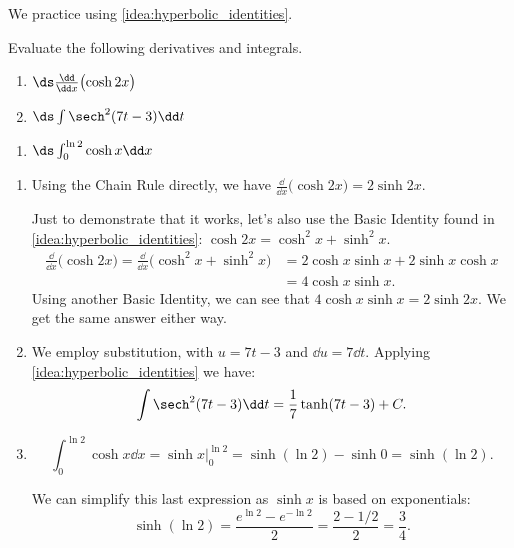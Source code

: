 We practice using \autoref{idea:hyperbolic_identities}.

\begin{example}\label{ex_hf2}%
Evaluate the following derivatives and integrals.\\
\begin{minipage}[t]{.5\linewidth}
\begin{enumerate}
\item		$\ds\frac{\dd}{\dd x}\bigl(\cosh 2x\bigr)$
\item		$\ds\int \sech^2(7t-3)\dd t$
\end{enumerate}
\end{minipage}%
\begin{minipage}[t]{.5\linewidth}
\begin{enumerate}\addtocounter{enumi}{2}
\item		$\ds \int_0^{\ln 2} \cosh x\dd x$
\end{enumerate}
\end{minipage}
\solution
\begin{enumerate}
\item		Using the Chain Rule directly, we have $\frac{\dd}{\dd x} \bigl(\cosh 2x\bigr) = 2\sinh 2x$.

Just to demonstrate that it works, let's also use the Basic Identity found in \autoref{idea:hyperbolic_identities}: $\cosh 2x = \cosh^2x+\sinh^2x$.
\begin{align*}
\frac{\dd}{\dd x}\bigl(\cosh 2x\bigr) = \frac{\dd}{\dd x}\bigl(\cosh^2x+\sinh^2x\bigr)
&= 2\cosh x\sinh x+ 2\sinh x\cosh x\\
&= 4\cosh x\sinh x.
\end{align*}
Using another Basic Identity, we can see that $4\cosh x\sinh x = 2\sinh 2x$. We get the same answer either way.

\item	  We employ substitution, with $u = 7t-3$ and $\dd u = 7\dd t$. Applying
\autoref{idea:hyperbolic_identities} we have:
\[\int \sech^2 (7t-3)\dd t = \frac17\tanh (7t-3) + C.\]

\item \[\int_0^{\ln 2} \cosh x\dd x = \sinh x\Big|_0^{\ln 2} = \sinh (\ln 2) - \sinh 0 = \sinh(\ln 2).\]

We can simplify this last expression as $\sinh x$ is based on exponentials:
\[\sinh(\ln 2) = \frac{e^{\ln 2}-e^{-\ln 2}}2 = \frac{2-1/2}{2} = \frac34.\]
\end{enumerate}
\end{example}

